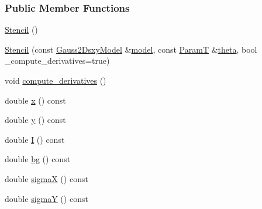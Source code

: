 \subsubsection*{Public Member Functions}
\begin{DoxyCompactItemize}
\item 
\hyperlink{classmappel_1_1Gauss2DsxyModel_1_1Stencil_ae006204abb79ef7892843f978b37d1ff}{Stencil} ()
\item 
\hyperlink{classmappel_1_1Gauss2DsxyModel_1_1Stencil_acd39272bd87fa0151c7860d39766a9b8}{Stencil} (const \hyperlink{classmappel_1_1Gauss2DsxyModel}{Gauss2\+Dsxy\+Model} \&\hyperlink{classmappel_1_1Gauss2DsxyModel_1_1Stencil_ace9cfc5f878412e99dc8e3256a5110b8}{model}, const \hyperlink{classmappel_1_1Gauss2DsxyModel_1_1Stencil_a73f8f8811eb4ea2e45476a45e188c06d}{ParamT} \&\hyperlink{classmappel_1_1Gauss2DsxyModel_1_1Stencil_a73791bb1fd46a0af05bd477ca8455ed3}{theta}, bool \+\_\+compute\+\_\+derivatives=true)
\item 
void \hyperlink{classmappel_1_1Gauss2DsxyModel_1_1Stencil_a52379932618469a171c7ecde691fa36a}{compute\+\_\+derivatives} ()
\item 
double \hyperlink{classmappel_1_1Gauss2DsxyModel_1_1Stencil_ae906561e87b8b39d9611541a31b2dba8}{x} () const 
\item 
double \hyperlink{classmappel_1_1Gauss2DsxyModel_1_1Stencil_a189a3141d3b67b0d639e6dbd6be93955}{y} () const 
\item 
double \hyperlink{classmappel_1_1Gauss2DsxyModel_1_1Stencil_a915d6c63d7373ed1fe51eb3be3f5fb0c}{I} () const 
\item 
double \hyperlink{classmappel_1_1Gauss2DsxyModel_1_1Stencil_abc9b743a286e9fbdb9a96ac49078a3e1}{bg} () const 
\item 
double \hyperlink{classmappel_1_1Gauss2DsxyModel_1_1Stencil_a9bcd6fccedc0d6f7fe0ce943c157a4db}{sigmaX} () const 
\item 
double \hyperlink{classmappel_1_1Gauss2DsxyModel_1_1Stencil_a3f615b479cb08bcc5532bdee1473ec37}{sigmaY} () const 
\end{DoxyCompactItemize}
